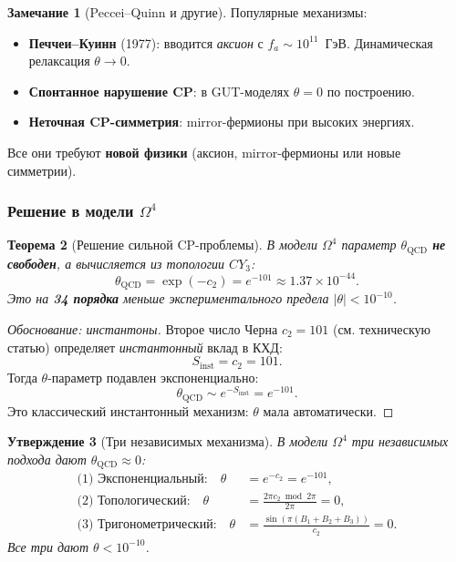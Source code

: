 \documentclass[11pt,a4paper]{article}
\newcommand{\CY}{CY_3}
\newcommand{\Om}{\Omega^4}
\newtheorem{theorem}{Теорема}[section]
\newtheorem{proposition}[theorem]{Утверждение}
\theoremstyle{definition}
\newtheorem{remark}[theorem]{Замечание}
\begin{document}
\begin{remark}[Peccei--Quinn и другие]
\label{rem:pq-review}
Популярные механизмы:
\begin{itemize}
    \item \textbf{Печчеи--Куинн} (1977): вводится \emph{аксион}
          с $f_a \sim 10^{11}$~ГэВ. Динамическая релаксация
          $\theta \to 0$.
    \item \textbf{Спонтанное нарушение CP}: в GUT-моделях
          $\theta = 0$ по построению.
    \item \textbf{Неточная CP-симметрия}: mirror-фермионы
          при высоких энергиях.
\end{itemize}
Все они требуют \textbf{новой физики} (аксион, mirror-фермионы
или новые симметрии).
\end{remark}

\subsubsection{Решение в модели \texorpdfstring{$\Om$}{Omega^4}}

\begin{theorem}[Решение сильной CP-проблемы]
\label{thm:strong-cp-review}
В модели $\Om$ параметр $\theta_{\text{QCD}}$ \textbf{не свободен}, а
\emph{вычисляется} из топологии $\CY$:
\begin{equation}
    \boxed{
    \theta_{\text{QCD}} = \exp(-c_2) = e^{-101} \approx 1.37 \times 10^{-44}.
    }
    \label{eq:theta-solution-review}
\end{equation}
Это на \textbf{34 порядка} меньше экспериментального предела
$|\theta| < 10^{-10}$.
\end{theorem}

\begin{proof}[Обоснование: инстантоны]
Второе число Черна $c_2 = 101$ (см. техническую статью) определяет
\emph{инстантонный} вклад в КХД:
\begin{equation}
    S_{\text{inst}} = c_2 = 101.
\end{equation}
Тогда $\theta$-параметр подавлен экспоненциально:
\begin{equation}
    \theta_{\text{QCD}} \sim e^{-S_{\text{inst}}} = e^{-101}.
\end{equation}
Это классический инстантонный механизм: $\theta$ мала автоматически.
\end{proof}

\begin{proposition}[Три независимых механизма]
\label{prop:three-mechanisms-review}
В модели $\Om$ три независимых подхода дают $\theta_{\text{QCD}} \approx 0$:
\begin{align}
    \text{(1) Экспоненциальный:} \quad
    \theta &= e^{-c_2} = e^{-101}, \\[0.3em]
    \text{(2) Топологический:} \quad
    \theta &= \frac{2\pi c_2 \bmod 2\pi}{2\pi} = 0, \\[0.3em]
    \text{(3) Тригонометрический:} \quad
    \theta &= \frac{\sin(\pi (B_1 + B_2 + B_3))}{c_2} = 0.
\end{align}
Все три дают $\theta < 10^{-10}$.
\end{proposition}
\end{document}
